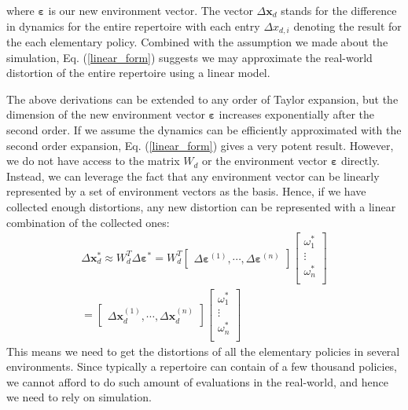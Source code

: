 where $\bm{\varepsilon}$ is our new environment vector. 
The vector $\Delta \bm{x}_d$ stands for the difference in dynamics for the entire repertoire with each entry $\Delta x_{d, i}$ denoting the result for the each elementary policy.
Combined with the assumption we made about the simulation, Eq. (\ref{linear_form}) suggests we may approximate the real-world distortion of the entire repertoire using a linear model. 


The above derivations can be extended to any order of Taylor expansion, but the dimension of the new environment vector $\bm{\varepsilon}$ increases exponentially after the second order.
If we assume the dynamics can be efficiently approximated with the second order expansion, Eq. (\ref{linear_form}) gives a very potent result.
However, we do not have access to the matrix $W_d$ or the environment vector $\bm{\varepsilon}$ directly. 
Instead, we can leverage the fact that any environment vector can be linearly represented by a set of environment vectors as the basis.
Hence, if we have collected enough distortions, any new distortion can be  represented with a linear combination of the collected ones:
\begin{equation}
\begin{gathered}
\Delta \bm{x}_d^* \approx
W_{d}^T \Delta \bm{\varepsilon}^* = 
W_{d}^T
\begin{bmatrix}
\Delta \bm{\varepsilon}^{(1)}, \cdots, \Delta \bm{\varepsilon}^{(n)}
\end{bmatrix}
\begin{bmatrix}
\omega_1^* \\
\vdots \\
\omega_n^* \\
\end{bmatrix}
\\ =
\begin{bmatrix}
\Delta \bm{x}_d^{(1)}, \cdots, \Delta \bm{x}_d^{(n)}
\end{bmatrix}
\begin{bmatrix}
\omega_1^* \\
\vdots \\
\omega_n^* \\
\end{bmatrix}
\end{gathered}
\label{linear_combination}
\end{equation}
This means we need to get the distortions of all the elementary policies in several environments.
Since typically a repertoire can contain of a few thousand policies,
we cannot afford to do such amount of evaluations in the real-world, and hence we need to rely on simulation.


